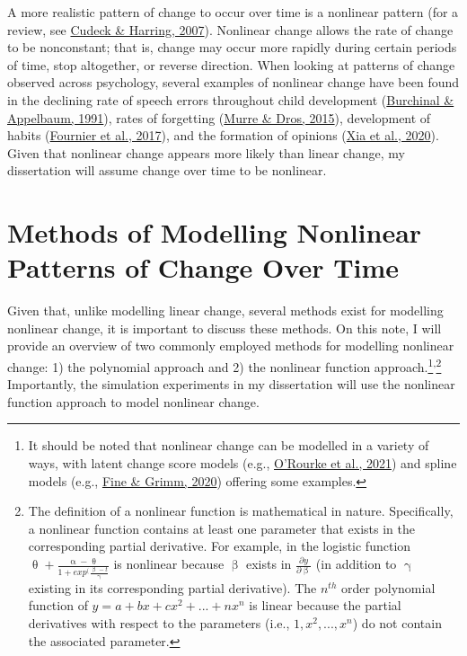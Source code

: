 \documentclass[
12pt, %
twoside,
english]{guelphthesis}
\begin{document}
A more realistic pattern of change to occur over time is a nonlinear pattern (for a review, see \protect\hyperlink{ref-cudeck2007}{Cudeck \& Harring, 2007}). Nonlinear change allows the rate of change to be nonconstant; that is, change may occur more rapidly during certain periods of time, stop altogether, or reverse direction. When looking at patterns of change observed across psychology, several examples of nonlinear change have been found in the declining rate of speech errors throughout child development (\protect\hyperlink{ref-burchinal1991}{Burchinal \& Appelbaum, 1991}), rates of forgetting (\protect\hyperlink{ref-murre2015}{Murre \& Dros, 2015}), development of habits (\protect\hyperlink{ref-fournier2017}{Fournier et al., 2017}), and the formation of opinions (\protect\hyperlink{ref-xia2020}{Xia et al., 2020}). Given that nonlinear change appears more likely than linear change, my dissertation will assume change over time to be nonlinear.

\hypertarget{modelling-change}{%
\section{Methods of Modelling Nonlinear Patterns of Change Over Time}\label{modelling-change}}




Given that, unlike modelling linear change, several methods exist for modelling nonlinear change, it is important to discuss these methods. On this note, I will provide an overview of two commonly employed methods for modelling nonlinear change: 1) the polynomial approach and 2) the nonlinear function approach.\footnote{It should be noted that nonlinear change can be modelled in a variety of ways, with latent change score models (e.g., \protect\hyperlink{ref-orourke2021}{O'Rourke et al., 2021}) and spline models (e.g., \protect\hyperlink{ref-fine2020}{Fine \& Grimm, 2020}) offering some examples.}\textsuperscript{,}\footnote{The definition of a nonlinear function is mathematical in nature. Specifically, a nonlinear function contains at least one parameter that exists in the corresponding partial derivative. For example, in the logistic function $\uptheta + \frac{\upalpha - \uptheta}{1 + exp^(\frac{\upbeta - t}{\upgamma}}$ is nonlinear because $\upbeta$ exists in $\frac{\partial y}{\partial \upbeta}$ (in addition to $\upgamma$ existing in its corresponding partial derivative). The $n^{th}$ order polynomial function of $y = a + bx + cx^2 + ... + nx^n$ is linear because  the partial derivatives with respect to the parameters (i.e., $1, x^2, ..., x^n$) do not contain the associated parameter.} Importantly, the simulation experiments in my dissertation will use the nonlinear function approach to model nonlinear change.
\end{document}

